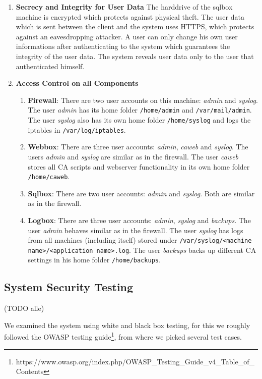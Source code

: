 \documentclass[english]{article}
\begin{document}
\begin{enumerate}
\item \textbf{Secrecy and Integrity for User Data}
  The harddrive of the sqlbox machine is encrypted which protects against physical theft. The user data which is sent between the client and the system uses HTTPS, which protects against an eavesdropping attacker. A user can only change his own user informations after authenticating to the system which guarantees the integrity of the user data. The system reveals user data only to the user that authenticated himself.
\item \textbf{Access Control on all Components}
\begin{enumerate}[label=(\alph*)]
\item \textbf{Firewall}: There are two user accounts on this machine: \textit{admin} and \textit{syslog}. The user \textit{admin} has its home folder \texttt{/home/admin} and \texttt{/var/mail/admin}. The user \textit{syslog} also has its own home folder \texttt{/home/syslog} and logs the iptables in \texttt{/var/log/iptables}.
\item \textbf{Webbox}: There are three user accounts: \textit{admin}, \textit{caweb} and \textit{syslog}. The users \textit{admin} and \textit{syslog} are similar as in the firewall. The user \textit{caweb} stores all CA scripts and webserver functionality in its own home folder \texttt{/home/caweb}. 
\item \textbf{Sqlbox}: There are two user accounts: \textit{admin} and \textit{syslog}. Both are similar as in the firewall. 
\item \textbf{Logbox}: There are three user accounts: \textit{admin}, \textit{syslog} and \textit{backups}. The user \textit{admin} behaves similar as in the firewall. The user \textit{syslog} has logs from all machines (including itself) stored under \texttt{/var/syslog/<machine name>/<application name>.log}. The user \textit{backups} backs up different CA settings in his home folder \texttt{/home/backups}.
\end{enumerate}
\end{enumerate}

\subsection{System Security Testing} (TODO alle)

We examined the system using white and black box testing, for this we roughly followed the OWASP testing guide\footnote{https://www.owasp.org/index.php/OWASP\_Testing\_Guide\_v4\_Table\_of\_Contents}, from where we picked several test cases.
\end{document}
